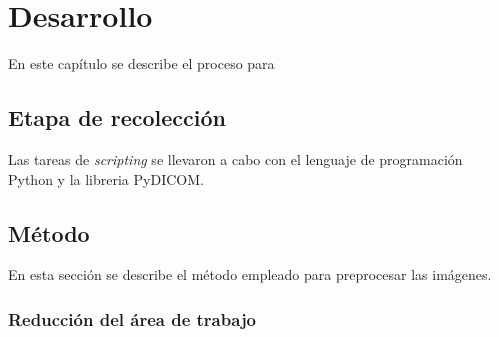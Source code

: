 \chapter{Desarrollo}
En este capítulo se describe el proceso para 

\section{Etapa de recolección}
Las tareas de \textit{scripting} se llevaron a cabo con el lenguaje de
programación Python y la libreria PyDICOM.

\section{Método}
En esta sección se describe el método empleado para preprocesar las imágenes.

\subsection{Reducción del área de trabajo}



